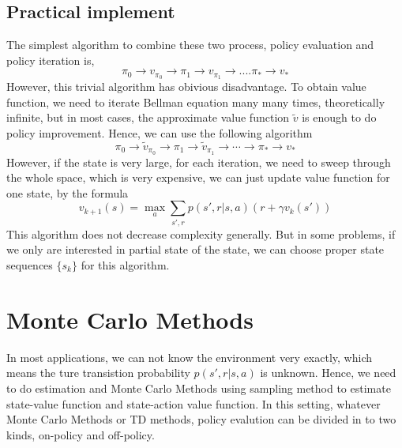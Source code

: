 \documentclass[11pt,a4paper]{article}
\def\tilde{\widetilde}
\def\tilde{\widetilde}
\begin{document}
\subsection{Practical implement}
The simplest algorithm to combine these two process, policy evaluation and policy iteration is,\\ 
$$ \pi_0 \to v_{\pi_0} \to \pi_1 \to v_{\pi_1} \to .... \pi_* \to v_* $$
However, this trivial algorithm has obivious disadvantage. To obtain value function, we need to iterate Bellman equation many many times, theoretically infinite, but in most cases, the approximate value function $\tilde{v}$ is enough to do policy improvement. Hence, we can use the following algorithm \\
$$\pi_0 \to \tilde{v}_{\pi_0} \to \pi_1 \to \tilde{v}_{\pi_1} \to \cdots \to \pi_* \to v_{*}$$
However, if the state is very large, for each iteration, we need to sweep through the whole space, which is very expensive, we can just update value function for one state, by the formula
\begin{equation}
v_{k+1}(s) = \max_{a}\sum_{s',r}p(s',r|s,a)(r+\gamma v_k(s'))
\end{equation}
This algorithm does not decrease complexity generally. But in some problems, if we only are interested in partial state of the state, we can choose proper state sequences $\{s_k\}$ for this algorithm.

\section{Monte Carlo Methods}
In most applications, we can not know the environment very exactly, which means the ture transistion probability $p(s',r|s,a)$ is unknown. Hence, we need to do estimation and Monte Carlo Methods using sampling method to estimate state-value function and state-action value function. In this setting, whatever Monte Carlo Methods or TD methods, policy evalution can be divided in to two kinds, on-policy and off-policy.
\end{document}
